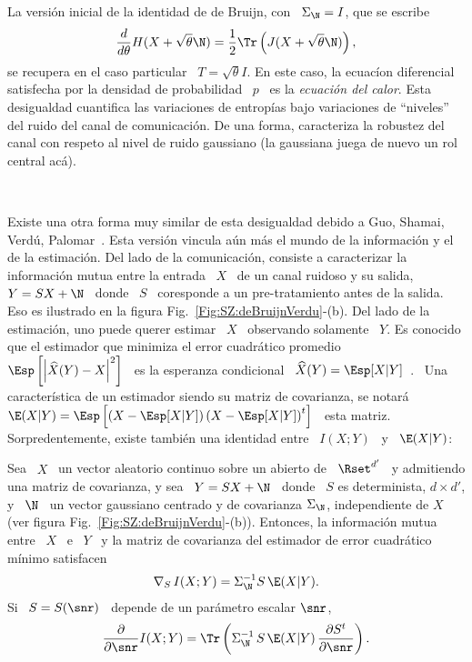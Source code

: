 La versi\'on  inicial de la identidad de  de Bruijn, con \  $\Sigma_\N = I$,
que se escribe
%
\[
\frac{d}{d\theta}     H(X+\sqrt{\theta}    \N)    =     \frac12    \Tr\left(
  J(X+\sqrt{\theta} \N) \right),
\]
%
se recupera  en el caso particular  \ $T =  \sqrt{\theta} I$.  En este  caso, la
ecuac\'ion diferencial satisfecha por la densidad  de probabilidad \ $p$ \ es la
{\it  ecuaci\'on del  calor}.  Esta  desigualdad cuantifica  las  variaciones de
entrop\'ias   bajo  variaciones   de  ``niveles''   del  ruido   del   canal  de
comunicaci\'on. De una  forma, caracteriza la robustez del  canal con respeto al
nivel de ruido gaussiano (la gaussiana juega de nuevo un rol central ac\'a).

\

Existe una  otra forma  muy similar  de esta desigualdad  debido a  Guo, Shamai,
Verd\'u,  Palomar~\cite{GuoSha05, PalVer06,  TorZoz18}.  Esta  versi\'on vincula
a\'un m\'as el mundo  de la informaci\'on y el de la  estimaci\'on.  Del lado de
la  comunicaci\'on, consiste  a  caracterizar la  informaci\'on  mutua entre  la
entrada \ $X$ \ de un canal ruidoso y su  salida, \ $Y = S X + \N$ \ donde \
$S$ \ coresponde a un pre-tratamiento antes de la salida. Eso es ilustrado en la
figura  Fig.~\ref{Fig:SZ:deBruijnVerdu}-(b).  Del lado  de la  estimaci\'on, uno
puede querer  estimar \ $X$  \ observando solamente  \ $Y$.  Es conocido  que el
estimador  que minimiza  el error  cuadr\'atico promedio  \  $\Esp\left[ \left|
    \widehat{X}(Y)  - X  \right|^2 \right]$  \  es la  esperanza condicional  \
$\widehat{X}(Y)   =    \Esp[X|Y]$~\cite{Kay93,   Rob07,   LehCas98}.     \   Una
caracter\'istica de un  estimador siendo su matriz de  covarianza, se notar\'a \
$\E(X|Y)  =  \Esp\left[  \left( X  -  \Esp[X|Y]  \right)  \left( X  -  \Esp[X|Y]
  \right)^t  \right]$ \  esta  matriz.  Sorpredentemente,  existe tambi\'en  una
identidad entre \ $I(X;Y)$ \ y \ $\E(X|Y)$:
%
\begin{teorema}[Identidad de Guo--Shamai--Verd\'u]
\label{Teo:SZ:GuoShamaiVerdu}
%
  Sea \ $X$ \ un vector aleatorio  continuo sobre un abierto de \ $\Rset^{d'}$ \
  y admitiendo una  matriz de covarianza, y sea \  $Y = S X +  \N$ \ donde \
  $S$  es determinista,  $d  \times d'$,  y  \ $\N$  \  un vector  gaussiano
  centrado  y de covarianza  $\Sigma_\N$, independiente  de $X$  (ver figura
  Fig.~\ref{Fig:SZ:deBruijnVerdu}-(b)). Entonces, la informaci\'on mutua entre \
  $X$ \ e \ $Y$ \ y  la matriz de covarianza del estimador de error cuadr\'atico
  m\'inimo satisfacen
  \[
  \nabla_S \, I(X;Y) = \Sigma_\N^{-1} S \, \E(X|Y).
  \]
  Si \ $S = S(\snr)$ \ depende de un par\'ametro escalar $\snr$,
  \[
  \frac{\partial}{\partial \snr} I(X;Y) = \Tr\left( \Sigma_\N^{-1} \, S \,
    \E(X|Y) \, \frac{\partial S^t}{\partial \snr} \right).
  \]
\end{teorema}
